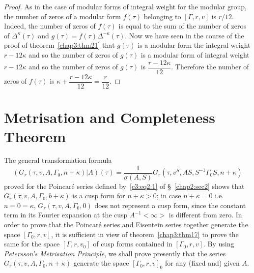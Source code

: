\begin{proof}
As in the case of modular forms of integral weight for the modular
group, the number of zeros of a modular form $f(\tau)$ belonging to
$[\Gamma, r, v]$ is $r/12$. Indeed, the number of zeros of $f(\tau)$
is equal to the sum of the number of zeros of $\Delta^{\kappa}(\tau)$
and $g(\tau)=f(\tau)\Delta^{-\kappa}(\tau)$. Now we have seen in the
course of the proof of theorem~\ref{chap3:thm21} that $g(\tau)$ is a modular form the
integral weight $r-12\kappa$ and so the number of zeros of $g(\tau)$
is a modular form of integral weight $r-12\kappa$ and so the number of
zeros of $g(\tau)$ is $\dfrac{r-12\kappa}{12}$. Therefore the number
of zeros of $f(\tau)$ is $\kappa +
\dfrac{r-12\kappa}{12}=\dfrac{r}{12}$. 
\end{proof}

\section{Metrisation and Completeness Theorem}\label{chap3:sec3}%

The general transformation formula
$$
(G_r(\tau,v,A,\Gamma_0,n+\kappa)|A)(\tau) = \frac{1}{\sigma(A,S)}
G_r(\tau, v^S, A S, S^{-1} \Gamma_0 S, n+ \kappa)
$$\pageoriginale 
proved for the Poincar\'e series defined by~\eqref{c3:eq2:1} of 
\S~\ref{chap2:sec2} shows that\break
$G_r(\tau, v, A, \Gamma_0, b+\kappa)$ is a cusp form for $n+\kappa>0$;
in case $n+\kappa=0$ i.e. $n=0=\kappa$, $G_r(\tau, v, A, \Gamma_0,0)$
does not represent a cusp form, since the constant term in its Fourier
expansion at the cusp $A^{-1}<\infty>$ is different from zero. In
order to prove that the Poincar\'e series and Eisentein series
together generate the space $[\Gamma_0, r, v]$, it is sufficient in
view of theorem~\ref{chap3:thm17} to prove the same for the space $[\Gamma, r,v_0]$
of cusp forms contained in $[\Gamma_0, r, v]$. By using
\textit{Petersson's Metrisation Principle}, we shall prove presently
that the series $G_r(\tau, v,A,\Gamma_0,n+\kappa)$ generate the space
$[\Gamma_0, r, v]_0$ for any (fixed and) given $A$. 

